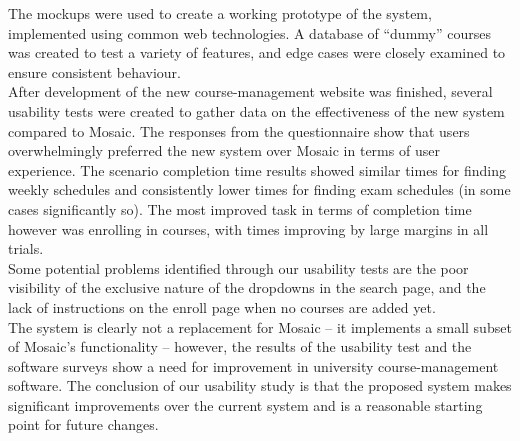 \documentclass[10pt]{article}
\begin{document}
\begin{multicols}{2}
The mockups were used to create a working prototype of the system, implemented using common web technologies. A database of ``dummy'' courses was created to test a variety of features, and edge cases were closely examined to ensure consistent behaviour.\\

After development of the new course-management website was finished, several usability tests were created to gather data on the effectiveness of the new system compared to Mosaic. The responses from the questionnaire show that users overwhelmingly preferred the new system over Mosaic in terms of user experience. The scenario completion time results showed similar times for finding weekly schedules and consistently lower times for finding exam schedules (in some cases significantly so). The most improved task in terms of completion time however was enrolling in courses, with times improving by large margins in all trials.\\

Some potential problems identified through our usability tests are the poor visibility of the exclusive nature of the dropdowns in the search page, and the lack of instructions on the enroll page when no courses are added yet.\\

The system is clearly not a replacement for Mosaic -- it implements a small subset of Mosaic's functionality -- however, the results of the usability test and the software surveys show a need for improvement in university course-management software. The conclusion of our usability study is that the proposed system makes significant improvements over the current system and is a reasonable starting point for future changes.

\end{multicols}
\end{document}
